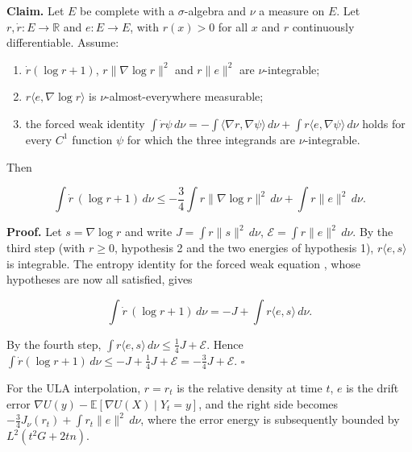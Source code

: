 \documentclass[11pt,a4paper]{article}
\begin{document}
\textbf{Claim.} Let \(E\) be complete with a \(\sigma\)-algebra and \(\nu\) a measure on \(E\). Let \(r,\dot r:E\to\mathbb R\) and \(e:E\to E\), with \(r(x)>0\) for all \(x\) and \(r\) continuously differentiable. Assume:



\begin{enumerate}


\item \(\dot r(\log r+1)\), \(r\|\nabla\log r\|^2\) and \(r\|e\|^2\) are \(\nu\)-integrable;

\item \(r\langle e,\nabla\log r\rangle\) is \(\nu\)-almost-everywhere measurable;

\item the forced weak identity \(\int\dot r\psi\,d\nu=-\int\langle\nabla r,\nabla\psi\rangle\,d\nu+\int r\langle e,\nabla\psi\rangle\,d\nu\) holds for every \(C^1\) function \(\psi\) for which the three integrands are \(\nu\)-integrable.

\end{enumerate}



Then


\[\int\dot r\,(\log r+1)\,d\nu\le-\frac34\int r\|\nabla\log r\|^2\,d\nu+\int r\|e\|^2\,d\nu.\]


\textbf{Proof.} Let \(s=\nabla\log r\) and write \(J=\int r\|s\|^2\,d\nu\), \(\mathcal E=\int r\|e\|^2\,d\nu\). By the third step (with \(r\ge0\), hypothesis 2 and the two energies of hypothesis 1), \(r\langle e,s\rangle\) is integrable. The entropy identity for the forced weak equation \cite[Section~3.5.4]{LangevinLean2026ULALSI}, whose hypotheses are now all satisfied, gives


\[\int\dot r\,(\log r+1)\,d\nu=-J+\int r\langle e,s\rangle\,d\nu.\]


By the fourth step, \(\int r\langle e,s\rangle\,d\nu\le\frac14J+\mathcal E\). Hence \(\int\dot r(\log r+1)\,d\nu\le-J+\frac14J+\mathcal E=-\frac34J+\mathcal E\). \(\square\)




For the ULA interpolation, \(r=r_t\) is the relative density at time \(t\), \(e\) is the drift error \(\nabla U(y)-\mathbb E[\nabla U(X)\mid Y_t=y]\), and the right side becomes \(-\frac34J_\nu(r_t)+\int r_t\|e\|^2\,d\nu\), where the error energy is subsequently bounded by \(L^2(t^2G+2tn)\).
\end{document}
